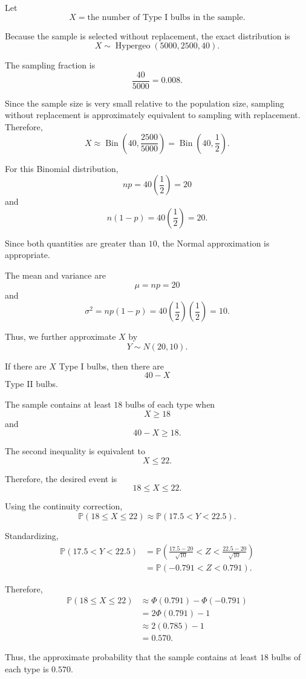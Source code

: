 \documentclass[11pt]{article}
\newenvironment{solution}{
    \par
    \begin{tcolorbox}[
        colback=white,
        colframe=uwgold,
        boxrule=0.7pt,
        arc=2mm,
        left=3mm,
        right=3mm,
        top=2mm,
        bottom=2mm,
        breakable,
        before skip=0.5em,
        after skip=1em,
        title=\textbf{Solution},
        coltitle=uwpurple,
        fonttitle=\bfseries
    ]
}{
    \end{tcolorbox}
}
\begin{document}
\begin{solution}

Let
\[
X=\text{the number of Type I bulbs in the sample}.
\]

Because the sample is selected without replacement, the exact distribution is
\[
X\sim\operatorname{Hypergeo}(5000,2500,40).
\]

The sampling fraction is
\[
\frac{40}{5000}=0.008.
\]

Since the sample size is very small relative to the population size, sampling
without replacement is approximately equivalent to sampling with replacement.
Therefore,
\[
X
\approx
\operatorname{Bin}\left(40,\frac{2500}{5000}\right)
=
\operatorname{Bin}\left(40,\frac12\right).
\]

For this Binomial distribution,
\[
np=40\left(\frac12\right)=20
\]
and
\[
n(1-p)=40\left(\frac12\right)=20.
\]

Since both quantities are greater than \(10\), the Normal approximation is
appropriate.

The mean and variance are
\[
\mu=np=20
\]
and
\[
\sigma^2=np(1-p)
=
40\left(\frac12\right)\left(\frac12\right)
=
10.
\]

Thus, we further approximate \(X\) by
\[
Y\sim N(20,10).
\]

If there are \(X\) Type I bulbs, then there are
\[
40-X
\]
Type II bulbs.

The sample contains at least \(18\) bulbs of each type when
\[
X\geq18
\]
and
\[
40-X\geq18.
\]

The second inequality is equivalent to
\[
X\leq22.
\]

Therefore, the desired event is
\[
18\leq X\leq22.
\]

Using the continuity correction,
\[
\mathbb{P}(18\leq X\leq22)
\approx
\mathbb{P}(17.5<Y<22.5).
\]

Standardizing,
\[
\begin{aligned}
\mathbb{P}(17.5<Y<22.5)
&=
\mathbb{P}\left(
\frac{17.5-20}{\sqrt{10}}
<
Z
<
\frac{22.5-20}{\sqrt{10}}
\right)\\
&=
\mathbb{P}(-0.791<Z<0.791).
\end{aligned}
\]

Therefore,
\[
\begin{aligned}
\mathbb{P}(18\leq X\leq22)
&\approx
\Phi(0.791)-\Phi(-0.791)\\
&=
2\Phi(0.791)-1\\
&\approx
2(0.785)-1\\
&=
 {0.570}.
\end{aligned}
\]

Thus, the approximate probability that the sample contains at least \(18\)
bulbs of each type is \(0.570\).

\end{solution}
\end{document}
